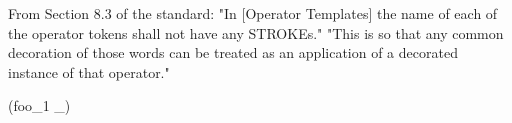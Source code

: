 From Section 8.3 of the standard: 
  "In [Operator Templates] the name of each of the operator
   tokens shall not have any STROKEs."
  "This is so that any common decoration of those words can be treated as
   an application of a decorated instance of that operator."

\begin{zed}
\generic (foo_{1} \_)
\end{zed}
